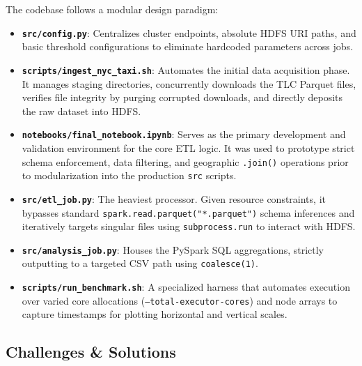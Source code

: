 The codebase follows a modular design paradigm:
\begin{itemize}
    \item \textbf{\texttt{src/config.py}}: Centralizes cluster endpoints, absolute HDFS URI paths, and basic threshold configurations to eliminate hardcoded parameters across jobs.

    \item \textbf{\texttt{scripts/ingest\_nyc\_taxi.sh}}: Automates the initial data acquisition phase. It manages staging directories, concurrently downloads the TLC Parquet files, verifies file integrity by purging corrupted downloads, and directly deposits the raw dataset into HDFS.

    \item \textbf{\texttt{notebooks/final\_notebook.ipynb}}: Serves as the primary development and validation environment for the core ETL logic. It was used to prototype strict schema enforcement, data filtering, and geographic \texttt{.join()} operations prior to modularization into the production \texttt{src} scripts.
    
    \item \textbf{\texttt{src/etl\_job.py}}: The heaviest processor. Given resource constraints, it bypasses standard \texttt{spark.read.parquet("*.parquet")} schema inferences and iteratively targets singular files using \texttt{subprocess.run} to interact with HDFS.
    
    \item \textbf{\texttt{src/analysis\_job.py}}: Houses the PySpark SQL aggregations, strictly outputting to a targeted CSV path using \texttt{coalesce(1)}.
    
    \item \textbf{\texttt{scripts/run\_benchmark.sh}}: A specialized harness that automates execution over varied core allocations (\texttt{--total-executor-cores}) and node arrays to capture timestamps for plotting horizontal and vertical scales.
\end{itemize}

\subsection{Challenges \& Solutions}
\label{subsec:challenges}

